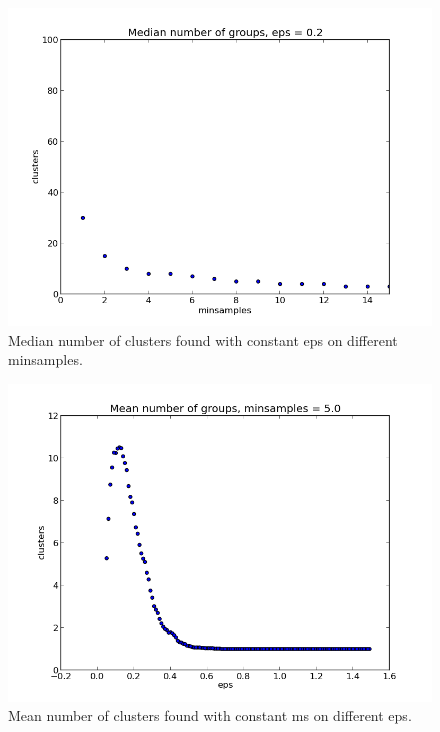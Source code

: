 \documentclass[english, oneside]{HYgradu}
\begin{document}
\begin{figure}
   \centering
   \includegraphics[width=\textwidth]{kuvat/eps-02.png}
   \caption{Median number of clusters found with constant eps on different minsamples.}\label{fig:epseffect}
\end{figure}

\begin{figure}
   \centering
   \includegraphics[width=\textwidth]{kuvat/ms-5.png}
   \caption{Mean number of clusters found with constant ms on different eps.}\label{fig:mseffect}
\end{figure}
\end{document}
